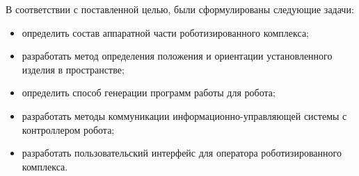 В соответствии с поставленной целью, были сформулированы следующие задачи:

\begin{itemize}
	\item определить состав аппаратной части роботизированного комплекса;
	\item разработать метод определения положения и ориентации установленного изделия в пространстве;
	\item определить способ генерации программ работы для робота;
	\item разработать методы коммуникации информационно-управляющей системы с контроллером робота;
	\item разработать пользовательский интерфейс для оператора роботизированного комплекса.
\end{itemize}
